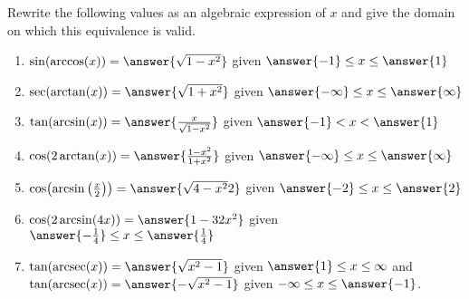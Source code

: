 \documentclass{ximera}
\author{Elizabeth Campolongo}
\begin{document}
\begin{exercise}
Rewrite the following values as an algebraic expression of $x$ and give the domain on which this equivalence is valid.%
\begin{enumerate}
\item $\sin(\arccos(x)) = \answer{\sqrt{1-x^2}}$ given $\answer{-1} \leq x \leq \answer{1}$
%
\item  $\sec(\arctan(x)) = \answer{\sqrt{1+x^2}}$ given $\answer{-\infty} \leq x \leq \answer{\infty}$
%
\item $\tan(\arcsin(x)) = \answer{\frac{x}{\sqrt{1-x^2}}}$ given $\answer{-1} < x < \answer{1}$
%
\item $\cos(2\arctan(x)) = \answer{\frac{1-x^2}{1+x^2}}$ given $\answer{-\infty} \leq x \leq \answer{\infty}$
%
\item $\cos\!\big(\!\arcsin\big(\frac{x}{2}\big)\big) = \answer{\sqrt{4-x^2}{2}}$ given $\answer{-2} \leq x \leq \answer{2}$
%
\item $\cos(2\arcsin(4x)) = \answer{1-32x^2}$ given $\answer{-\frac{1}{4}} \leq x \leq \answer{\frac{1}{4}}$
%
\item $\tan(\arcsec(x)) = \answer{\sqrt{x^2 - 1}}$ given $\answer{1} \leq x \leq \infty$ and \\
$\tan(\arcsec(x)) = \answer{-\sqrt{x^2-1}}$ given $-\infty \leq x \leq \answer{-1}$.
\end{enumerate}
\end{exercise}
\end{document}
